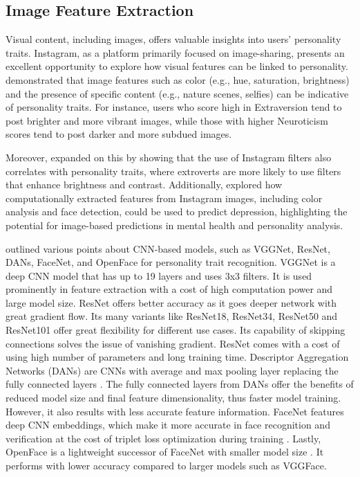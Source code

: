 \subsection{Image Feature Extraction}

Visual content, including images, offers valuable insights into users' personality traits. Instagram, as a platform primarily focused on image-sharing, presents an excellent opportunity to explore how visual features can be linked to personality. \citet{Ferwerda2018} demonstrated that image features such as color (e.g., hue, saturation, brightness) and the presence of specific content (e.g., nature scenes, selfies) can be indicative of personality traits. For instance, users who score high in Extraversion tend to post brighter and more vibrant images, while those with higher Neuroticism scores tend to post darker and more subdued images.

Moreover, \citet{Branz2020} expanded on this by showing that the use of Instagram filters also correlates with personality traits, where extroverts are more likely to use filters that enhance brightness and contrast. Additionally, \citet{Reece2017} explored how computationally extracted features from Instagram images, including color analysis and face detection, could be used to predict depression, highlighting the potential for image-based predictions in mental health and personality analysis.

\citet{Amin_Sjarif_Yuhaniz_2025} outlined various points about CNN-based models, such as VGGNet, ResNet, DANs, FaceNet, and OpenFace for personality trait recognition. VGGNet is a deep CNN model that has up to 19 layers and uses 3x3 filters. It is used prominently in feature extraction with a cost of high computation power and large model size. ResNet offers better accuracy as it goes deeper network with great gradient flow. Its many variants like ResNet18, ResNet34, ResNet50 and ResNet101 offer great flexibility for different use cases. Its capability of skipping connections solves the issue of vanishing gradient. ResNet comes with a cost of using high number of parameters and long training time. Descriptor Aggregation Networks (DANs) are CNNs with average and max pooling layer replacing the fully connected layers \citep{Zhang_Zhang_Wei_Wu_2016}. The fully connected layers from DANs offer the benefits of reduced model size and final feature dimensionality, thus faster model training. However, it also results with less accurate feature information. FaceNet features deep CNN embeddings, which make it more accurate in face recognition and verification at the cost of triplet loss optimization during training \citep{Schroff_Kalenichenko_Philbin_2015}. Lastly, OpenFace is a lightweight successor of FaceNet with smaller model size \citep{Amos_Ludwiczuk_Satyanarayanan_2016}. It performs with lower accuracy compared to larger models such as VGGFace. 

